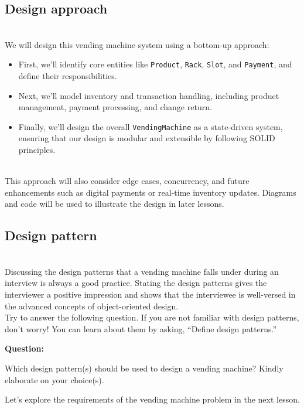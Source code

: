 \subsection{Design approach}\label{R5p5zj0_jAx-m1wOu67Fy}
\\
We will design this vending machine system using a bottom-up approach:

\begin{itemize}
\item
\protect{}\label{Lyau3o6zTiCpvcNY6WNCN}
First, we'll identify core entities like \texttt{Product}, \texttt{Rack}, \texttt{Slot}, and \texttt{Payment}, and define their responsibilities.
\item
\protect{}\label{vF3TEp5oS3Vyy0iQjPDWt}
Next, we'll model inventory and transaction handling, including product management, payment processing, and change return.
\item
\protect{}\label{hepnb-e8WGQs8NbWorm2x}
Finally, we'll design the overall \texttt{VendingMachine} as a state-driven system, ensuring that our design is modular and extensible by following SOLID principles.
\end{itemize}
\\
This approach will also consider edge cases, concurrency, and future enhancements such as digital payments or real-time inventory updates. Diagrams and code will be used to illustrate the design in later lessons.

\subsection{Design pattern~}\label{h66yInoUlo5wejX4l88xr}
\\
Discussing the design patterns that a vending machine falls under during an interview is always a good practice. Stating the design patterns gives the interviewer a positive impression and shows that the interviewee is well-versed in the advanced concepts of object-oriented design.
\\
Try to answer the following question. If you are not familiar with design patterns, don't worry! You can learn about them by asking, ``Define design patterns.''

\textbf{Question:}

Which design pattern(s) should be used to design a vending machine? Kindly elaborate on your choice(s).

Let's explore the requirements of the vending machine problem in the next lesson.

\subsection{}\label{8oUVSluo_Rm9Ccfs1l3iv}

